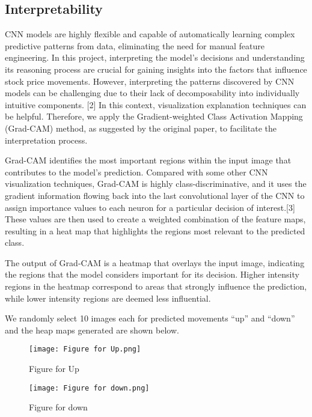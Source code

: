 \documentclass{article}
\begin{document}
{\subsection{Interpretability}
CNN models are highly flexible and capable of automatically learning complex predictive patterns from data, eliminating the need for manual feature engineering. In this project, interpreting the model's decisions and understanding its reasoning process are crucial for gaining insights into the factors that influence stock price movements. However, interpreting the patterns discovered by CNN models can be challenging due to their lack of decomposability into individually intuitive components. [2] In this context, visualization explanation techniques can be helpful. Therefore, we apply the Gradient-weighted Class Activation Mapping (Grad-CAM) method, as suggested by the original paper, to facilitate the interpretation process.

Grad-CAM identifies the most important regions within the input image that contributes to the model’s prediction. Compared with some other CNN visualization techniques, Grad-CAM is highly class-discriminative, and it uses the gradient information flowing back into the last convolutional layer of the CNN to assign importance values to each neuron for a particular decision of interest.[3] These values are then used to create a weighted combination of the feature maps, resulting in a heat map that highlights the regions most relevant to the predicted class.

The output of Grad-CAM is a heatmap that overlays the input image, indicating the regions that the model considers important for its decision. Higher intensity regions in the heatmap correspond to areas that strongly influence the prediction, while lower intensity regions are deemed less influential.

We randomly select 10 images each for predicted movements “up” and “down” and the heap maps generated are shown below.

\begin{figure}[H]
	\centering
	\texttt{[image: Figure for Up.png]}
	\caption{Figure for Up}
\end{figure}

\begin{figure}[H]
	\centering
	\texttt{[image: Figure for down.png]}
	\caption{Figure for down}
\end{figure}

}
\end{document}
